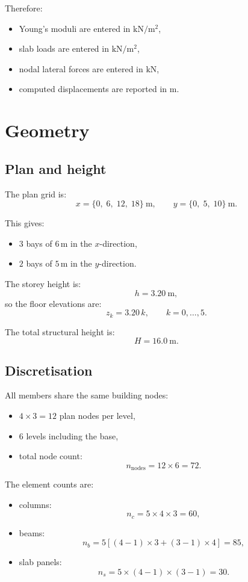 Therefore:
\begin{itemize}
  \item Young's moduli are entered in \(\mathrm{kN/m^2}\),
  \item slab loads are entered in \(\mathrm{kN/m^2}\),
  \item nodal lateral forces are entered in \(\mathrm{kN}\),
  \item computed displacements are reported in \(\mathrm{m}\).
\end{itemize}

\section{Geometry}

\subsection{Plan and height}

The plan grid is:
\[
x = \{0,\; 6,\; 12,\; 18\}\ \mathrm{m},
\qquad
y = \{0,\; 5,\; 10\}\ \mathrm{m}.
\]

This gives:
\begin{itemize}
  \item \(3\) bays of \(6\,\mathrm{m}\) in the \(x\)-direction,
  \item \(2\) bays of \(5\,\mathrm{m}\) in the \(y\)-direction.
\end{itemize}

The storey height is:
\[
h = 3.20\ \mathrm{m},
\]
so the floor elevations are:
\[
z_k = 3.20\,k, \qquad k = 0,\dots,5.
\]

The total structural height is:
\[
H = 16.0\ \mathrm{m}.
\]

\subsection{Discretisation}

All members share the same building nodes:
\begin{itemize}
  \item \(4 \times 3 = 12\) plan nodes per level,
  \item \(6\) levels including the base,
  \item total node count:
        \[
        n_\mathrm{nodes} = 12 \times 6 = 72.
        \]
\end{itemize}

The element counts are:
\begin{itemize}
  \item columns:
        \[
        n_c = 5 \times 4 \times 3 = 60,
        \]
  \item beams:
        \[
        n_b = 5 \left[(4-1) \times 3 + (3-1) \times 4\right] = 85,
        \]
  \item slab panels:
        \[
        n_s = 5 \times (4-1) \times (3-1) = 30.
        \]
\end{itemize}

